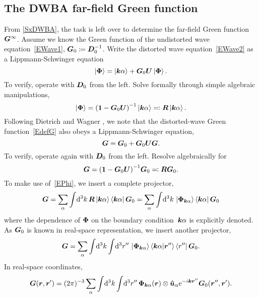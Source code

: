 \subsection{The DWBA far-field Green function}\label{SDWGreen}

From \cref{SxDWBA}, the task is left over
to determine the far-field Green function~$\bm{G}^\infty$.
Assume we know the Green function of the undistorted wave equation~\cref{EWave1},
$\bm{G}_0\coloneqq\bm{D}_0^{-1}$.
Write the distorted wave equation~\cref{EWave2}
as a Lippmann-Schwinger equation
\begin{equation}\label{ELS2}
  \ket{\v\Phi}
  = \ket\ka + \TGo\TU\ket{\v\Phi}.
\end{equation}
To verify, operate with $\bm{D}_0$ from the left.
Solve formally through simple algebraic manipulations,
\begin{equation}\label{EPhi}
  \ket{\v\Phi} = {(\v1-\TGo\TU)}^{-1}\ket\ka \eqqcolon \TR\ket\ka.
\end{equation}
Following Dietrich and Wagner \cite{DiWa84,DiWa85,DiWa16},
we note that the distorted-wave Green function~\cref{EdefG}
also obeys a Lippmann-Schwinger equation,
\begin{equation}
   \bm{G} = \bm{G}_0 + \bm{G}_0\bm{U}\bm{G}.
\end{equation}
To verify, operate again with $\bm{D}_0$ from the left.
Resolve algebraically for
\begin{equation}
  \bm{G}  = {(\bm{1}-\bm{G}_0\bm{U})}^{-1} \bm{G}_0 \eqqcolon \bm{R}\bm{G}_0.
\end{equation}
To make use of~\cref{EPhi},
we insert a complete projector,
\begin{equation}
  \bm{G}  = \sum_\alpha \int\!\mathrm d^3k\,\bm{R}\ket{{{\bm{k}}\alpha}}\bra{{{\bm{k}}\alpha}}\bm{G}_0
       = \sum_\alpha \int\!\mathrm d^3k\,\ket{\bm{\Phi}_{{\bm{k}}\alpha}}\bra{{{\bm{k}}\alpha}}\bm{G}_0
\end{equation}
where the dependence of $\bm{\Phi}$ on the boundary condition~${{\bm{k}}\alpha}$ is explicitly denoted.
As $\bm{G}_0$ is known in real-space representation, we insert another projector,
\begin{equation}
  \bm{G}  = \sum_\alpha \int\!\mathrm d^3k\int\!\mathrm d^3r''\, \ket{\bm{\Phi}_{{\bm{k}}\alpha}}\braket{{{\bm{k}}\alpha}|\bm{r}''}\bra{r''}\bm{G}_0.
\end{equation}
In real-space coordinates,
\begin{equation}\label{EGrspace}
  \TG(\r,\r')
  = (2\pi)^{-3} \sum_\alpha \int\!\d^3k\int\!\d^3r''\,
        \v\Phi_\ka(\r)\otimes \hu_\alpha \e^{-i\k\r''} \TGo(\r'',\r').
\end{equation}
